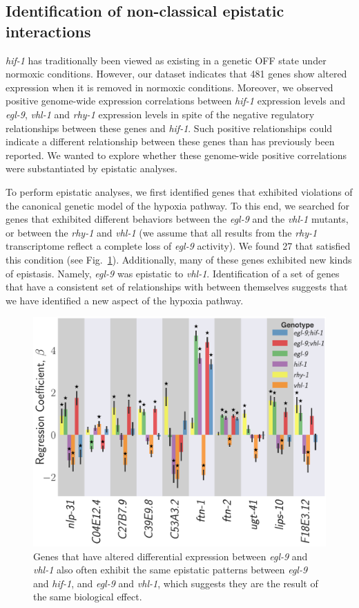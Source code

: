 \documentclass[9pt,twocolumn,twoside]{pnas-new}
\newcommand{\egl}{\emph{egl-9}}
\newcommand{\rhy}{\emph{rhy-1}}
\newcommand{\vhl}{\emph{vhl-1}}
\newcommand{\hif}{\emph{hif-1}}
\newcommand{\hifn}{481}
\newcommand{\hifohtargets}{27}
\begin{document}
\subsection{Identification of non-classical epistatic interactions}
\label{sub:hifoh}
\hif{} has traditionally been viewed as existing in a genetic OFF state under
normoxic conditions. However, our dataset indicates that \hifn{} genes show
altered expression when it is removed in normoxic conditions. Moreover, we
observed positive genome-wide expression correlations between \hif{} expression
levels and \egl{}, \vhl{} and \rhy{} expression levels in spite of the negative
regulatory relationships between these genes and \hif{}. Such positive
relationships could indicate a different relationship between these genes
than has previously been reported. We wanted to explore whether these genome-wide
positive correlations were substantiated by epistatic analyses.

To perform epistatic analyses, we first identified genes that exhibited violations
of the canonical genetic model of the hypoxia pathway. To this end, we searched for
genes that exhibited different behaviors between the \egl{} and the \vhl{}
mutants, or between the \rhy{} and \vhl{} (we assume that all results from the
\rhy{} transcriptome reflect a complete loss of \egl{} activity). We found
\hifohtargets{} that satisfied this condition (see Fig.~\ref{fig:hif1oh}).
Additionally, many of these genes exhibited new kinds of epistasis. Namely,
\egl{} was epistatic to \vhl{}. Identification of a set of genes that have a
consistent set of relationships with between themselves suggests that we have
identified a new aspect of the hypoxia pathway.

\begin{figure}[tbhp]
\centering
\includegraphics[width=\linewidth]{figs/hif1oh_epistasis.pdf}
\caption{
Genes that have altered differential expression between \egl{} and \vhl{} also
often exhibit the same epistatic patterns between \egl{} and \hif{}, and \egl{}
and \vhl{}, which suggests they are the result of the same biological effect.
}
\label{fig:hif1oh}
\end{figure}
\end{document}
